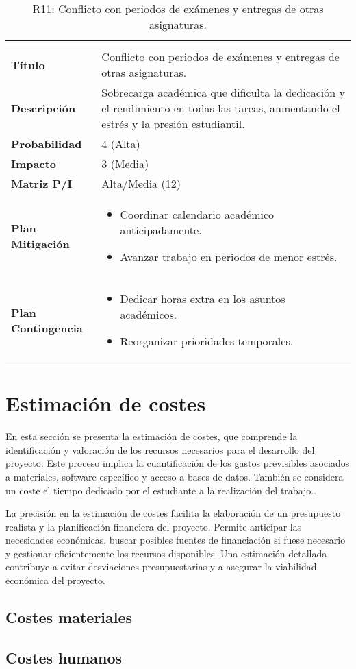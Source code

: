 \begin{table}[H]
\centering
\begin{tabular}{|>{\bfseries}l|p{10cm}|}
\hline
\rowcolor{lightgray}
\multicolumn{2}{|c|}{\textbf{Riesgo R11}} \\ \hline
Título & Conflicto con periodos de exámenes y entregas de otras asignaturas.\\ \hline
Descripción & Sobrecarga académica que dificulta la dedicación y el rendimiento en todas las tareas, aumentando el estrés y la presión estudiantil. \\ \hline
Probabilidad & 4 (Alta) \\ \hline
Impacto & 3 (Media) \\ \hline
Matriz P/I & Alta/Media (12)\\ \hline
Plan Mitigación & 
\begin{itemize}
\item Coordinar calendario académico anticipadamente.
\item Avanzar trabajo en periodos de menor estrés.
\end{itemize} \\ \hline
Plan Contingencia & 
\begin{itemize}
\item Dedicar horas extra en los asuntos académicos.
\item Reorganizar prioridades temporales.
\end{itemize} \\ \hline
\end{tabular}
\caption{R11: Conflicto con periodos de exámenes y entregas de otras asignaturas.}
\label{tab:R11}
\end{table}

\section{Estimación de costes}
En esta sección se presenta la estimación de costes, que comprende la identificación y valoración de los recursos necesarios para el desarrollo del proyecto. Este proceso implica la cuantificación de los gastos previsibles asociados a materiales, software específico y acceso a bases de datos. También se considera un coste el tiempo dedicado por el estudiante a la realización del trabajo..

La precisión en la estimación de costes facilita la elaboración de un presupuesto realista y la planificación financiera del proyecto. Permite anticipar las necesidades económicas, buscar posibles fuentes de financiación si fuese necesario y gestionar eficientemente los recursos disponibles. Una estimación detallada contribuye a evitar desviaciones presupuestarias y a asegurar la viabilidad económica del proyecto.

\subsection{Costes materiales}
\subsection{Costes humanos}
